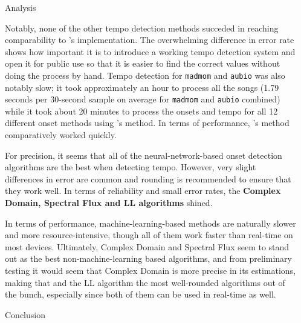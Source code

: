 \documentclass[xcolor={table,xdraw}]{beamer}       %
\begin{document}
\begin{frame}
\begin{columns}
\begin{column}{0.33\textwidth}
    \end{column}


    \begin{column}{0.33\textwidth}

      \begin{block}{Analysis}
        \setlength{\parindent}{1em}

        Notably, none of the other tempo detection methods succeded in reaching
        comparability to \citeauthor*{bram}'s implementation. The overwhelming
        difference in error rate shows how important it is to introduce a
        working tempo detection system and open it for public use so that it is
        easier to find the correct values without doing the process by hand.
        Tempo detection for \texttt{madmom} and \texttt{aubio} was also notably
        slow; it took approximately an hour to process all the songs (1.79
        seconds per 30-second sample on average for \texttt{madmom} and
        \texttt{aubio} combined) while it took about 20 minutes to process the
        onsets and tempo for all 12 different onset methods using
        \citeauthor*{bram}'s method. In terms of performance,
        \citeauthor*{bram}'s method comparatively worked quickly.
        
        For precision, it seems that all of the neural-network-based onset
        detection algorithms are the best when detecting tempo. However, very
        slight differences in error are common and rounding is recommended to
        ensure that they work well. In terms of reliability and small error
        rates, the \textbf{Complex Domain, Spectral Flux and LL algorithms}
        shined.
        
        In terms of performance, machine-learning-based methods are naturally
        slower and more resource-intensive, though all of them work faster than
        real-time on most devices. Ultimately, Complex Domain and Spectral Flux
        seem to stand out as the best non-machine-learning based algorithms, and
        from preliminary testing it would seem that Complex Domain is more
        precise in its estimations, making that and the LL algorithm the most
        well-rounded algorithms out of the bunch, especially since both of them
        can be used in real-time as well.
       \end{block}

      \begin{block}{Conclusion}
        \setlength{\parindent}{1em}


\end{block}
\end{column}
\end{columns}
\end{frame}
\end{document}
